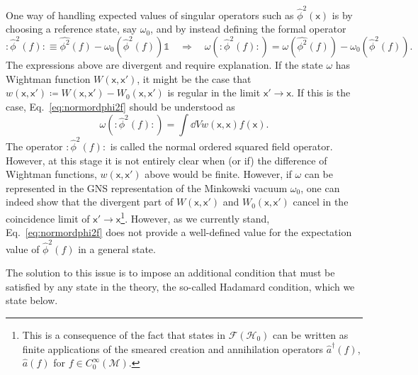 \documentclass[letterpaper,12pt,titlepage,oneside,final]{book}
\newcommand{\normord}[1]{\vcentcolon\mathrel{#1}\vcentcolon}
\providecommand{\vcentcolon}{\mathrel{\mathop{:}}}
\newcommand{\openone}{\mathds{1}}
\newcommand{\M}{\mathcal{M}}
\newcommand{\mf}{\mathsf}%
\begin{document}
One way of handling expected values of singular operators such as $\hat{\phi}^2(\mf x)$ is by choosing a reference state, say $\omega_0$, and by instead defining the formal operator
\begin{equation}\label{eq:normordphi2f}
    \normord{\hat{\phi}^2(f)} \equiv \hat{\phi^2}(f)-\omega_0(\hat{\phi}^2(f))\openone \quad\Rightarrow\quad \omega(\normord{\hat{\phi}^2(f)}) = \omega(\hat{\phi^2}(f))-\omega_0(\hat{\phi}^2(f)).
\end{equation}
The expressions above are divergent and require explanation. If the state $\omega$ has Wightman function $W(\mf x, \mf x')$, it might be the case that $w(\mf x, \mf x') \coloneqq W(\mf x,\mf x') - W_0(\mf x, \mf x')$ is regular in the limit $\mf x'\to \mf x$. If this is the case, Eq.~\eqref{eq:normordphi2f} should be understood as
\begin{equation}
    \omega(\normord{\hat{\phi}^2(f)}) = \int \dd V w(\mf x, \mf x)f(\mf x).
\end{equation}
The operator $\normord{\hat{\phi}^2(f)}$ is called the normal ordered squared field operator. However, at this stage it is not entirely clear when (or if) the difference of Wightman functions, $w(\mf x, \mf x')$ above would be finite. However, if $\omega$ can be represented in the GNS representation of the Minkowski vacuum $\omega_0$, one can indeed show that the divergent part of $W(\mf x, \mf x')$ and $W_0(\mf x, \mf x')$ cancel in the coincidence limit of $\mf x' \to \mf x$\footnote{This is a consequence of the fact that states in $\mathcal{F}(\mathscr{H}_0)$ can be written as finite applications of the smeared creation and annihilation operators $\hat{a}^\dagger(f)$, $\hat{a}(f)$ for $f\in C_0^\infty(\M)$.}. However, as we currently stand, Eq.~\eqref{eq:normordphi2f} does not provide a well-defined value for the expectation value of $\hat{\phi}^2(f)$ in a general state. 

The solution to this issue is to impose an additional condition that must be satisfied by any state in the theory, the so-called Hadamard condition, which we state below.
\end{document}
